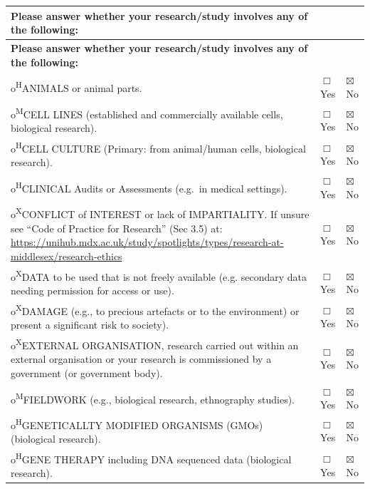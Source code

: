 \documentclass[12pt,a4paper]{article}
\begin{document}
\vspace{8pt}
\begingroup
\footnotesize
\begin{longtable}{|p{10.3cm}|p{1.4cm}|p{1.4cm}|}
\hline
\textbf{Please answer whether your research/study involves any of the following:} & & \\
\hline
\endfirsthead
\hline
\textbf{Please answer whether your research/study involves any of the following:} & & \\
\hline
\endhead
{\ttfamily o}\quad \textsuperscript{H}ANIMALS or animal parts. & $\Box$ Yes & $\boxtimes$ No \\ \hline
{\ttfamily o}\quad \textsuperscript{M}CELL LINES (established and commercially available cells, biological research). & $\Box$ Yes & $\boxtimes$ No \\ \hline
{\ttfamily o}\quad \textsuperscript{H}CELL CULTURE (Primary: from animal/human cells, biological research). & $\Box$ Yes & $\boxtimes$ No \\ \hline
{\ttfamily o}\quad \textsuperscript{H}CLINICAL Audits or Assessments (e.g.\ in medical settings). & $\Box$ Yes & $\boxtimes$ No \\ \hline
{\ttfamily o}\quad \textsuperscript{X}CONFLICT of INTEREST or lack of IMPARTIALITY. If unsure see ``Code of Practice for Research'' (Sec 3.5) at: \url{https://unihub.mdx.ac.uk/study/spotlights/types/research-at-middlesex/research-ethics} & $\Box$ Yes & $\boxtimes$ No \\ \hline
{\ttfamily o}\quad \textsuperscript{X}DATA to be used that is not freely available (e.g. secondary data needing permission for access or use). & $\Box$ Yes & $\boxtimes$ No \\ \hline
{\ttfamily o}\quad \textsuperscript{X}DAMAGE (e.g., to precious artefacts or to the environment) or present a significant risk to society). & $\Box$ Yes & $\boxtimes$ No \\ \hline
{\ttfamily o}\quad \textsuperscript{X}EXTERNAL ORGANISATION, research carried out within an external organisation or your research is commissioned by a government (or government body). & $\Box$ Yes & $\boxtimes$ No \\ \hline
{\ttfamily o}\quad \textsuperscript{M}FIELDWORK (e.g., biological research, ethnography studies). & $\Box$ Yes & $\boxtimes$ No \\ \hline
{\ttfamily o}\quad \textsuperscript{H}GENETICALLTY MODIFIED ORGANISMS (GMOs) (biological research). & $\Box$ Yes & $\boxtimes$ No \\ \hline
{\ttfamily o}\quad \textsuperscript{H}GENE THERAPY including DNA sequenced data (biological research). & $\Box$ Yes & $\boxtimes$ No \\ \hline

\end{longtable}
\end{document}

